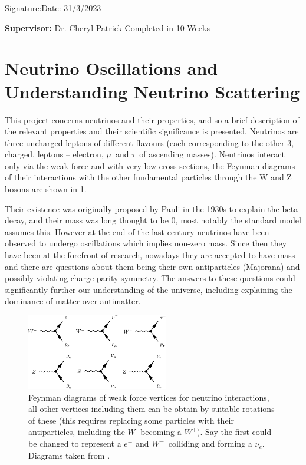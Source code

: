 \documentclass[a4paper,12pt]{article}
\newcommand{\Mu}{$\mu$}
\newcommand{\Tau}{$\tau$}
\newcommand{\Ne}{$\nu_e$}
\newcommand{\Wp}{$W^+$}
\newcommand{\Wm}{$W^-$}
\begin{document}
\vspace*{4cm}
Signature:\hfill Date:  31/3/2023

\vfill
{\bf Supervisor:} Dr. Cheryl Patrick
\hfill
Completed in 10 Weeks
\newpage

\tableofcontents

\newpage

\pagestyle{plain}
\setcounter{page}{1}

\section{Neutrino Oscillations and Understanding Neutrino Scattering}
This project concerns neutrinos and their properties, and so a brief description of the relevant properties and their scientific significance is presented.
Neutrinos are three uncharged leptons of different flavours (each corresponding to the other 3, charged, leptons -- electron, \Mu\ and \Tau\ of ascending masses).
Neutrinos interact only via the weak force and with very low cross sections, the Feynman diagrams of their interactions with the other fundamental particles through the W and Z bosons are shown in \cref{fig:nu_feyn}.

Their existence was originally proposed by Pauli in the 1930s to explain the beta decay, and their mass was long thought to be 0, most notably the standard model assumes this.
However at the end of the last century neutrinos have been observed to undergo oscillations which implies non-zero mass.
Since then they have been at the forefront of research, nowadays they are accepted to have mass and there are questions about them being their own antiparticles (Majorana) and possibly violating charge-parity symmetry.
The answers to these questions could significantly further our understanding of the universe, including explaining the dominance of matter over antimatter.

\begin{figure}[H]
    \centering
    \includegraphics[width=0.55\textwidth]{figures/NeutrinoFeynman.pdf}
    \caption{
        Feynman diagrams of weak force vertices for neutrino interactions, all other vertices including them can be obtain by suitable rotations of these
        (this requires replacing some particles with their antiparticles, including the \Wm becoming a \Wp).
        Say the first could be changed to represent a $e^-$ and \Wp\ colliding and forming a \Ne.
        Diagrams taken from \cite{potterFeynmanDiagramsParticlea}.
    }\label{fig:nu_feyn}
\end{figure}
\end{document}
